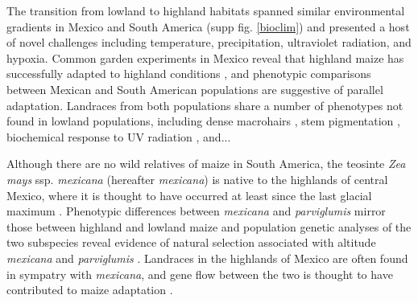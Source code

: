 The transition from lowland to highland habitats spanned similar environmental gradients in Mexico and South America (supp fig. \ref{bioclim}) and presented a host of novel challenges including  temperature, precipitation, ultraviolet radiation, and hypoxia. 
%
%
%
%
%
%
Common garden experiments in Mexico reveal that highland maize has successfully adapted to highland conditions \cite[]{Mercer2008}, and phenotypic comparisons between Mexican and South American populations are suggestive of parallel adaptation.  Landraces from both populations share a number of phenotypes not found in lowland populations, including dense macrohairs \cite[]{CITE}, stem pigmentation \cite[]{CITE}, biochemical response to UV radiation \cite[]{Casati2005}, and...
%
%

Although there are no wild relatives of maize in South America, the teosinte \emph{Zea mays} ssp. \emph{mexicana} (hereafter \emph{mexicana}) is native to the highlands of central Mexico, where it is thought to have occurred at least since the last glacial maximum \cite[]{Ross-Ibarra 2009, Hufford_niche}. Phenotypic differences between \emph{mexicana} and \emph{parviglumis} mirror those between highland and lowland maize \cite[]{Lauter_2004_15342532} and population genetic analyses of the two subspecies reveal evidence of natural selection associated with altitude \emph{mexicana} and \emph{parviglumis} \cite[]{Pyhajarvi2013}.  Landraces in the highlands of Mexico are often found in sympatry with  \emph{mexicana}, and gene flow between the two is thought to have contributed to maize adaptation \cite[]{Profford_2013}.

